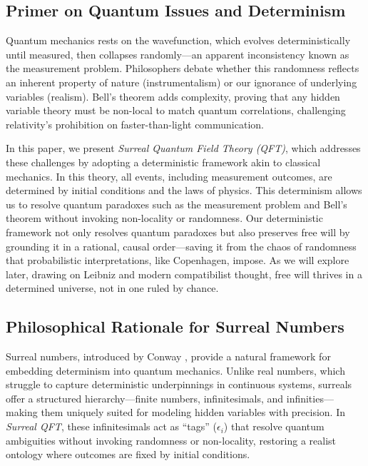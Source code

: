 \documentclass{article}
\begin{document}
\subsection{Primer on Quantum Issues and Determinism}
Quantum mechanics rests on the wavefunction, which evolves deterministically until measured, then collapses randomly---an apparent inconsistency known as the measurement problem. Philosophers debate whether this randomness reflects an inherent property of nature (instrumentalism) or our ignorance of underlying variables (realism). Bell's theorem adds complexity, proving that any hidden variable theory must be non-local to match quantum correlations, challenging relativity's prohibition on faster-than-light communication.

In this paper, we present \textit{Surreal Quantum Field Theory (QFT)}, which addresses these challenges by adopting a deterministic framework akin to classical mechanics. In this theory, all events, including measurement outcomes, are determined by initial conditions and the laws of physics. This determinism allows us to resolve quantum paradoxes such as the measurement problem and Bell's theorem without invoking non-locality or randomness. Our deterministic framework not only resolves quantum paradoxes but also preserves free will by grounding it in a rational, causal order---saving it from the chaos of randomness that probabilistic interpretations, like Copenhagen, impose. As we will explore later, drawing on Leibniz and modern compatibilist thought, free will thrives in a determined universe, not in one ruled by chance.

\subsection{Philosophical Rationale for Surreal Numbers}
Surreal numbers, introduced by Conway \cite{Conway1976}, provide a natural framework for embedding determinism into quantum mechanics. Unlike real numbers, which struggle to capture deterministic underpinnings in continuous systems, surreals offer a structured hierarchy---finite numbers, infinitesimals, and infinities---making them uniquely suited for modeling hidden variables with precision. In \textit{Surreal QFT}, these infinitesimals act as ``tags'' (\(\epsilon_i\)) that resolve quantum ambiguities without invoking randomness or non-locality, restoring a realist ontology where outcomes are fixed by initial conditions.
\end{document}
